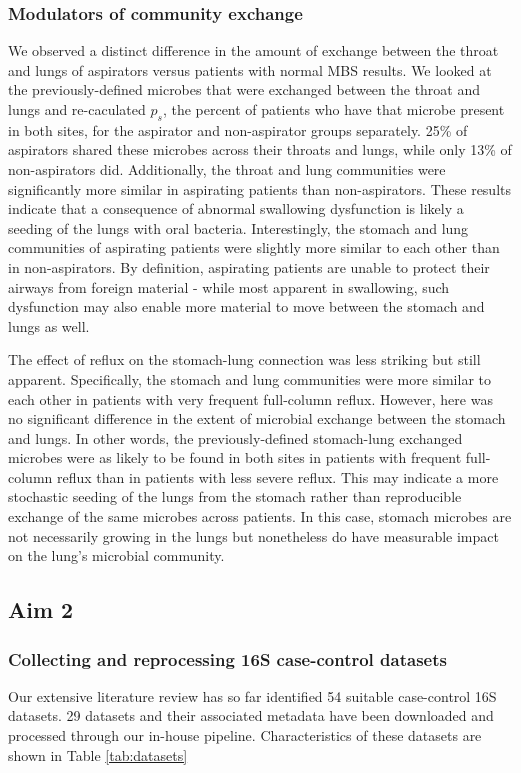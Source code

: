 \documentclass[12pt]{article}
\begin{document}
\subsubsection{Modulators of community exchange}
We observed a distinct difference in the amount of exchange between the 
throat and lungs of aspirators versus patients with normal MBS results.
We looked at the previously-defined microbes that were exchanged between 
the throat and lungs and re-caculated $p_s$, the percent of patients
who have that microbe present in both sites, for the aspirator and 
non-aspirator groups separately. 25\% of aspirators shared
these microbes across their throats and lungs, while only 13\% of 
non-aspirators did. Additionally, the throat and lung communities
were significantly more similar in aspirating patients than non-aspirators. These results indicate that a consequence of abnormal swallowing
dysfunction is likely a seeding of the lungs with oral bacteria.
Interestingly, the stomach and lung communities of aspirating
patients were slightly more similar to each other than in non-aspirators.
By definition, aspirating patients are unable to protect their airways
from foreign material - while most apparent in swallowing, such dysfunction
may also enable more material to move between the stomach and lungs as well.

The effect of reflux on the stomach-lung connection was less striking 
but still apparent. Specifically, the stomach and lung communities were
more similar to each other in patients with very frequent full-column reflux. However, here was no significant difference in the extent of
microbial exchange between the stomach and lungs. In other words,
the previously-defined stomach-lung exchanged microbes were as likely
to be found in both sites in patients with frequent full-column reflux
than in patients with less severe reflux. This may indicate a more
stochastic seeding of the lungs from the stomach rather than reproducible
exchange of the same microbes across patients. In this case, stomach 
microbes are not necessarily growing in the lungs but nonetheless do have 
measurable impact on the lung's microbial community.

\subsection{Aim 2}
\subsubsection{Collecting and reprocessing 16S case-control datasets}
Our extensive literature review has so far identified 54 suitable case-control 16S datasets.
29 datasets and their associated metadata have been downloaded and processed through our in-house pipeline.
Characteristics of these datasets are shown in Table \ref{tab:datasets}
\end{document}
